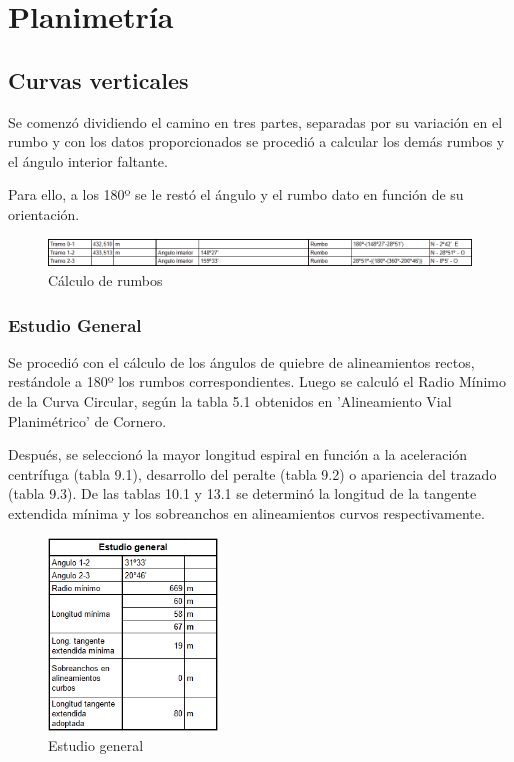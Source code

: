 \documentclass[../main.tex]{subfiles}
\begin{document}
\section{Planimetría}

\subsection{Curvas verticales}
Se comenzó dividiendo el camino en tres partes, separadas por su variación en el rumbo y con los datos proporcionados se procedió a calcular los demás rumbos y el ángulo interior faltante.

Para ello, a los 180º se le restó el ángulo y el rumbo dato en función de su orientación.

\begin{figure}[ht]
    \centering
    \includegraphics[width=\textwidth]{images/google_sheets/Screenshot_1.png}
    \caption{Cálculo de rumbos}
    \label{fig:rumbos}
\end{figure}


\subsubsection{Estudio General}
Se procedió con el cálculo de los ángulos de quiebre de alineamientos rectos, restándole a 180º los rumbos correspondientes. Luego se calculó el Radio Mínimo de la Curva Circular, según la tabla 5.1 obtenidos en 'Alineamiento Vial Planimétrico' de Cornero. \cite{cornero_planimetria}


Después, se seleccionó la mayor longitud espiral en función a la aceleración centrífuga (tabla 9.1), desarrollo del peralte (tabla 9.2) o apariencia del trazado (tabla 9.3). De las tablas 10.1 y 13.1 se determinó la longitud de la tangente extendida mínima y los sobreanchos en alineamientos curvos respectivamente. \cite{cornero_planimetria}

\begin{figure}[ht]
    \centering
    \includegraphics[width=0.4\textwidth]{images/google_sheets/Screenshot_2.png}
    \caption{Estudio general}
    \label{fig:estudio_general}
\end{figure}
\end{document}
